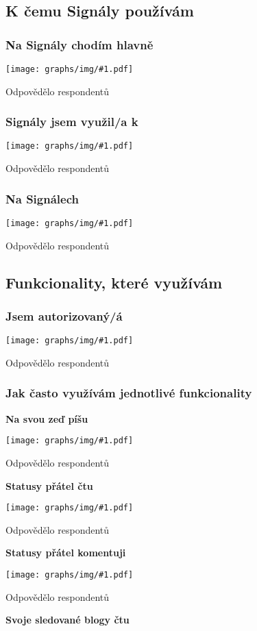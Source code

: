 \documentclass[12pt, a4paper, twoside]{article}
\newcommand{\answercount}[1]{Odpovědělo  respondentů}
\newcommand{\includegraph}[1]{
  \texttt{[image: graphs/img/\#1.pdf]}

  \answercount{#1}
}
\begin{document}
\subsection{K čemu Signály používám}\label{sec:kcemu}

\subsubsection{Na Signály chodím hlavně}

\includegraph{na_signaly_chodim_hlavne}

\subsubsection{Signály jsem využil/a k}

\includegraph{signaly_jsem_vyuzil_k}

\subsubsection{Na Signálech }

\includegraph{na_signalech_se_mi_povedlo}

\subsection{Funkcionality, které využívám}\label{sec:funkcionality}

\subsubsection{Jsem autorizovaný/á}

\includegraph{jsem_autorizovany}

\subsubsection{Jak často využívám jednotlivé funkcionality}

\textbf{Na svou zeď píšu}

\includegraph{funkcionality_status_pisu}

\textbf{Statusy přátel čtu}

\includegraph{funkcionality_status_ctu}

\textbf{Statusy přátel komentuji}

\includegraph{funkcionality_status_komentuji}

\textbf{Svoje sledované blogy čtu}
\end{document}
